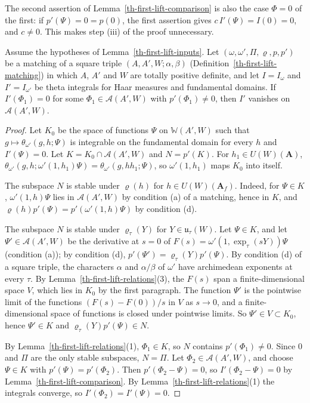 \begin{remark}\label{th-first-lift-comparison-short}
The second assertion of Lemma~\ref{th-first-lift-comparison} is also the case
$\Phi=0$ of the first: if $p'(\Psi)=0=p(0)$, the first assertion gives
$c\,I'(\Psi)=I(0)=0$, and $c\neq0$. This makes step (iii) of the proof
unnecessary.
\end{remark}

\begin{lemma}\label{th-first-lift-irreducible}
Assume the hypotheses of Lemma~\ref{th-first-lift-inputs}. Let
$(\omega,\omega',\Pi,\varrho,p,p')$ be a matching of a square triple
$(A,A',W;\alpha,\beta)$ (Definition~\ref{th-first-lift-matching}) in which
$A$, $A'$ and $W$ are totally positive definite, and let $I=I_\omega$ and
$I'=I_{\omega'}$ be theta integrals for Haar measures and fundamental domains.
If $I'(\Phi_1)=0$ for some $\Phi_1\in\mathcal A(A',W)$ with $p'(\Phi_1)\neq0$,
then $I'$ vanishes on $\mathcal A(A',W)$.
\end{lemma}
\begin{proof}
Let $K_0$ be the space of functions $\Psi$ on $\mathbb W(A',W)$ such that
$g\mapsto\theta_{\omega'}(g,h;\Psi)$ is integrable on the fundamental domain
for every $h$ and $I'(\Psi)=0$. Let $K=K_0\cap\mathcal A(A',W)$ and
$N=p'(K)$. For $h_1\in U(W)(\mathbf A)$,
$\theta_{\omega'}(g,h;\omega'(1,h_1)\Psi)=\theta_{\omega'}(g,hh_1;\Psi)$, so
$\omega'(1,h_1)$ maps $K_0$ into itself.

The subspace $N$ is stable under $\varrho(h)$ for $h\in U(W)(\mathbf A_f)$.
Indeed, for $\Psi\in K$, $\omega'(1,h)\Psi$ lies in $\mathcal A(A',W)$ by
condition (a) of a matching, hence in $K$, and
$\varrho(h)p'(\Psi)=p'(\omega'(1,h)\Psi)$ by condition (d).

The subspace $N$ is stable under $\varrho_\tau(Y)$ for $Y\in\mathfrak u_\tau(W)$.
Let $\Psi\in K$, and let $\Psi'\in\mathcal A(A',W)$ be the derivative at $s=0$
of $F(s)=\omega'(1,\exp_\tau(sY))\Psi$ (condition (a)); by condition (d),
$p'(\Psi')=\varrho_\tau(Y)p'(\Psi)$. By condition (d) of a square triple, the
characters $\alpha$ and $\alpha/\beta$ of $\omega'$ have archimedean exponents
at every $\tau$. By Lemma~\ref{th-first-lift-relations}(3), the $F(s)$ span a
finite-dimensional space $V$, which lies in $K_0$ by the first paragraph. The
function $\Psi'$ is the pointwise limit of the functions $(F(s)-F(0))/s$ in
$V$ as $s\to0$, and a finite-dimensional space of functions is closed under
pointwise limits. So $\Psi'\in V\subset K_0$, hence $\Psi'\in K$ and
$\varrho_\tau(Y)p'(\Psi)\in N$.

By Lemma~\ref{th-first-lift-relations}(1), $\Phi_1\in K$, so $N$ contains
$p'(\Phi_1)\neq0$. Since $0$ and $\Pi$ are the only stable subspaces, $N=\Pi$.
Let $\Phi_2\in\mathcal A(A',W)$, and choose $\Psi\in K$ with
$p'(\Psi)=p'(\Phi_2)$. Then $p'(\Phi_2-\Psi)=0$, so $I'(\Phi_2-\Psi)=0$ by
Lemma~\ref{th-first-lift-comparison}. By Lemma~\ref{th-first-lift-relations}(1)
the integrals converge, so $I'(\Phi_2)=I'(\Psi)=0$.
\end{proof}

